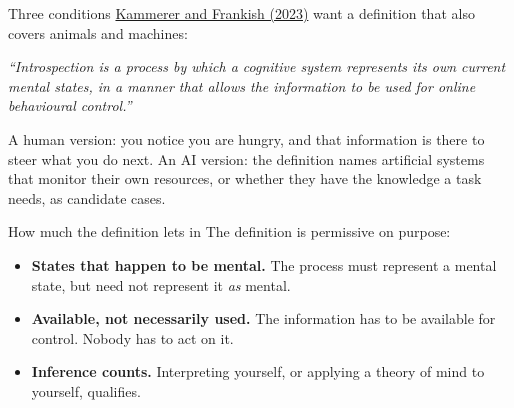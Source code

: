 \documentclass[aspectratio=169,11pt]{beamer}
\begin{document}
\begin{frame}[label=kfdef]{Three conditions}
\href{https://philarchive.org/archive/KAMWFC}{Kammerer and Frankish (2023)} want a definition that also covers animals and machines:

\vspace{0.3em}
{\small\itshape ``Introspection is a process by which a cognitive system represents its own current mental states, in a manner that allows the information to be used for online behavioural control.''}

\vspace{0.5em}
\begin{center}
\end{center}

\vspace{0.4em}
{\small A human version: you notice you are hungry, and that information is there to steer what you do next. An AI version: the definition names artificial systems that monitor their own resources, or whether they have the knowledge a task needs, as candidate cases.}
\end{frame}

\begin{frame}[label=kfloose]{How much the definition lets in}
The definition is permissive on purpose:

\vspace{0.4em}
\begin{itemize}\setlength\itemsep{6pt}
  \item {\small \textbf{States that happen to be mental.} The process must represent a mental state, but need not represent it \emph{as} mental.}
  \item {\small \textbf{Available, not necessarily used.} The information has to be available for control. Nobody has to act on it.}
  \item {\small \textbf{Inference counts.} Interpreting yourself, or applying a theory of mind to yourself, qualifies.}
\end{itemize}

\vspace{0.4em}
\begin{center}
\end{center}
\end{frame}
\end{document}

